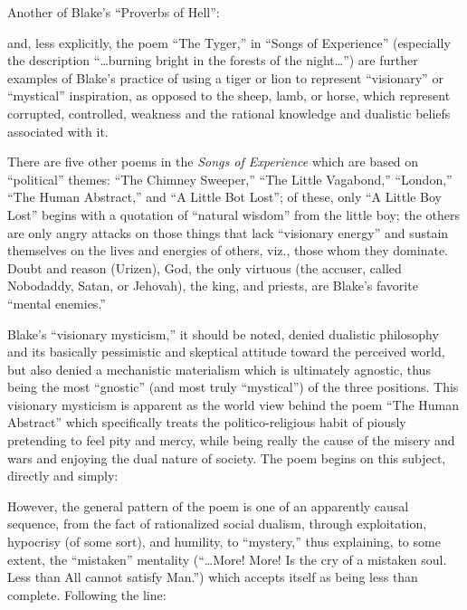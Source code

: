 \noindent Another of Blake's \enquote{Proverbs of Hell}:


\noindent and, less explicitly, the poem \enquote{The Tyger,} in \enquote{Songs of Experience} (especially the description \enquote{\dots burning bright
in the forests of the night\dots}) are further examples of Blake's practice of using a tiger or lion to represent \enquote{visionary}
or \enquote{mystical} inspiration, as opposed to the sheep, lamb, or horse, which represent corrupted, controlled, weakness and the rational
knowledge and dualistic beliefs associated with it.

There are five other poems in the \emph{Songs of Experience} which are based on \enquote{political} themes: \enquote{The Chimney Sweeper,}
\enquote{The Little Vagabond,} \enquote{London,} \enquote{The Human Abstract,} and \enquote{A Little Bot Lost}; of these, only \enquote{A Little Boy Lost} begins with a quotation of \enquote{natural wisdom}
from the little boy; the others are only angry attacks on those things that lack \enquote{visionary energy} and sustain themselves on the lives and energies of others, viz.,
those whom they dominate. Doubt and reason (Urizen), God, the only virtuous (the accuser, called Nobodaddy, Satan, or Jehovah), the king, and priests, are Blake's favorite \enquote{mental enemies.}

Blake's \enquote{visionary mysticism,} it should be noted, denied dualistic philosophy and its basically pessimistic and skeptical attitude toward
the perceived world, but also denied a mechanistic materialism which is ultimately agnostic, thus being the most \enquote{gnostic} (and most truly \enquote{mystical}) of
the three positions. This visionary mysticism is apparent as the world view behind the poem \enquote{The Human Abstract} which specifically treats the politico-religious habit of piously
pretending to feel pity and mercy, while being really the cause of the misery and wars and enjoying the dual nature of society. The poem begins on this subject, directly and simply:


However, the general pattern of the poem is one of an apparently causal sequence, from the fact of rationalized social dualism,
through exploitation, hypocrisy (of some sort), and humility, to \enquote{mystery,} thus explaining, to some extent,
the \enquote{mistaken} mentality (\enquote{\dots More! More! Is the cry of a mistaken soul. Less than All cannot satisfy Man.}) which accepts itself as being
less than complete. Following the line:

